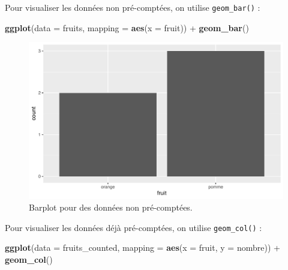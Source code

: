 \documentclass[a4paperpaper,]{article}
\newenvironment{Shaded}{\begin{snugshade}}{\end{snugshade}}
\newcommand{\DataTypeTok}[1]{\textcolor[rgb]{0.00,0.34,0.68}{#1}}
\newcommand{\KeywordTok}[1]{\textcolor[rgb]{0.12,0.11,0.11}{\textbf{#1}}}
\newcommand{\NormalTok}[1]{\textcolor[rgb]{0.12,0.11,0.11}{#1}}
\newcommand{\OperatorTok}[1]{\textcolor[rgb]{0.12,0.11,0.11}{#1}}
\newcommand{\StringTok}[1]{\textcolor[rgb]{0.75,0.01,0.01}{#1}}
\begin{document}
Pour visualiser les données non pré-comptées, on utilise \texttt{geom\_bar()} :

\begin{Shaded}
\begin{Highlighting}[]
\KeywordTok{ggplot}\NormalTok{(}\DataTypeTok{data =}\NormalTok{ fruits, }\DataTypeTok{mapping =} \KeywordTok{aes}\NormalTok{(}\DataTypeTok{x =}\NormalTok{ fruit)) }\OperatorTok{+}
\StringTok{  }\KeywordTok{geom_bar}\NormalTok{()}
\end{Highlighting}
\end{Shaded}

\begin{figure}[htpb]

{\centering \includegraphics[width=0.9\linewidth]{figure/barplot-1} 

}

\caption{Barplot pour des données non pré-comptées.}\label{fig:barplot}
\end{figure}

Pour visualiser les données déjà pré-comptées, on utilise \texttt{geom\_col()} :

\begin{Shaded}
\begin{Highlighting}[]
\KeywordTok{ggplot}\NormalTok{(}\DataTypeTok{data =}\NormalTok{ fruits_counted, }\DataTypeTok{mapping =} \KeywordTok{aes}\NormalTok{(}\DataTypeTok{x =}\NormalTok{ fruit, }\DataTypeTok{y =}\NormalTok{ nombre)) }\OperatorTok{+}
\StringTok{  }\KeywordTok{geom_col}\NormalTok{()}
\end{Highlighting}
\end{Shaded}
\end{document}
